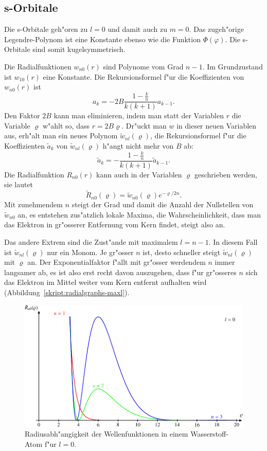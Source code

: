 \subsection{s-Orbitale}
Die s-Orbitale geh"oren zu $l=0$ und damit auch zu $m=0$.
Das zugeh"orige Legendre-Polynom ist eine Konstante ebenso wie die
Funktion $\Phi(\varphi)$.
Die s-Orbitale sind somit kugelsymmetrisch.

Die Radialfunktionen $w_{n0}(r)$ sind Polynome vom Grad $n-1$.
Im Grundzustand ist $w_{10}(r)$ eine Konstante.
Die Rekursionsformel f"ur die Koeffizienten von $w_{n0}(r)$ ist
\[
a_k=-2B\frac{1-\frac{k}{n}}{k(k+1)}a_{k-1}.
\]
Den Faktor $2B$ kann man eliminieren, indem man statt der Variablen $r$
die Variable $\varrho$ w"ahlt so, dass $r=2B \varrho$.
Dr"uckt man $w$ in dieser neuen Variablen aus, erh"alt man ein neues
Polynom $\tilde w_{nl}(\varrho)$, die Rekursionsformel f"ur die 
Koeffizienten $\tilde a_k$ von $\tilde w_{nl}(\varrho)$ h"angt nicht mehr
von $B$ ab:
\[
\tilde a_k = -\frac{1-\frac{k}{n}}{k(k+1)}\tilde a_{k-1}.
\]
Die Radialfunktion $R_{n0}(r)$ kann auch in der Variablen $\varrho$
geschrieben werden, sie lautet
\[
\tilde R_{n0}(\varrho)=\tilde w_{n0}(\varrho)e^{-\varrho/2n}.
\]
Mit zunehmendem $n$ steigt der Grad und damit die Anzahl der
Nullstellen von $\tilde w_{n0}$ an, es entstehen zus"atzlich lokale
Maxima, die Wahrscheinlichkeit, dass man das Elektron in gr"osserer
Entfernung vom Kern findet, steigt also an.

Das andere Extrem sind die Zust"ande mit maximalem $l=n-1$.
In diesem Fall ist $\tilde w_{nl}(\varrho)$ nur ein Monom.
Je gr"osser $n$ ist, desto schneller steigt $\tilde w_{nl}(\varrho)$ 
mit $\varrho$ an.
Der Exponentialfaktor f"allt mit gr"osser werdendem $n$ immer
langsamer ab, es ist also erst recht davon auszugehen, dass f"ur gr"osseres
$n$ sich das Elektron im Mittel weiter vom Kern entfernt aufhalten wird
(Abbildung~\ref{skript:radialgraphs-maxl}).

\begin{figure}
\centering
\includegraphics[width=\hsize]{graphics/radial-1.pdf}
\caption{Radiusabh"angigkeit der Wellenfunktionen in einem Wasserstoff-Atom
f"ur $l=0$.
\label{skript:radialgraphs-l0}}
\end{figure}

